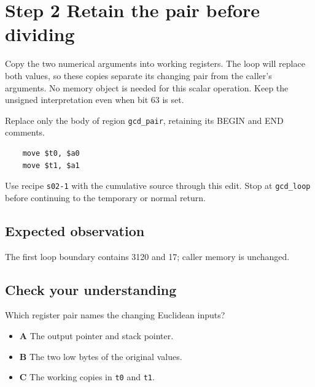 \section{Step 2 Retain the pair before dividing}\label{rsa-s02}

Copy the two numerical arguments into working registers. The loop will replace both values, so these copies separate its changing pair from the caller's arguments. No memory object is needed for this scalar operation. Keep the unsigned interpretation even when bit 63 is set.

Replace only the body of region \texttt{gcd\_pair}, retaining its BEGIN and END comments.

\begin{verbatim}
    move $t0, $a0
    move $t1, $a1
\end{verbatim}

Use recipe \texttt{s02-1} with the cumulative source through this edit. Stop at \texttt{gcd\_loop} before continuing to the temporary or normal return.

\subsection{Expected observation}
The first loop boundary contains 3120 and 17; caller memory is unchanged.

\subsection{Check your understanding}
Which register pair names the changing Euclidean inputs?

\begin{itemize}
  \item \textbf{A} The output pointer and stack pointer.
  \item \textbf{B} The two low bytes of the original values.
  \item \textbf{C} The working copies in \texttt{t0} and \texttt{t1}.
\end{itemize}
